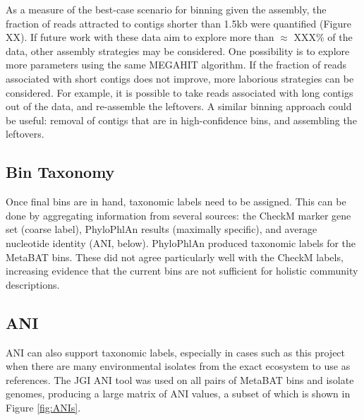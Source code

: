 As a measure of the best-case scenario for binning given the assembly, the fraction of reads attracted to contigs shorter than 1.5kb were quantified (Figure XX).
If future work with these data aim to explore more than $\approx$ XXX\% of the data, other assembly strategies may be considered.
One possibility is to explore more parameters using the same MEGAHIT algorithm.
If the fraction of reads associated with short contigs does not improve, more laborious strategies can be considered.
For example, it is possible to take reads associated with long contigs out of the data, and re-assemble the leftovers.
A similar binning approach could be useful: removal of contigs that are in high-confidence bins, and assembling the leftovers.



\subsection{Bin Taxonomy}

Once final bins are in hand, taxonomic labels need to be assigned.
This can be done by aggregating information from several sources: the CheckM marker gene set (coarse label), PhyloPhlAn results (maximally specific), and average nucleotide identity (ANI, below).
PhyloPhlAn produced taxonomic labels for the MetaBAT bins.
These did not agree particularly well with the CheckM labels, increasing evidence that the current bins are not sufficient for holistic community descriptions.

\subsection{ANI}

ANI can also support taxonomic labels, especially in cases such as this project when there are many environmental isolates from the exact ecosystem to use as references.
The JGI ANI tool was used on all pairs of MetaBAT bins and isolate genomes, producing a large matrix of ANI values, a subset of which is shown in Figure \ref{fig:ANIs}.

